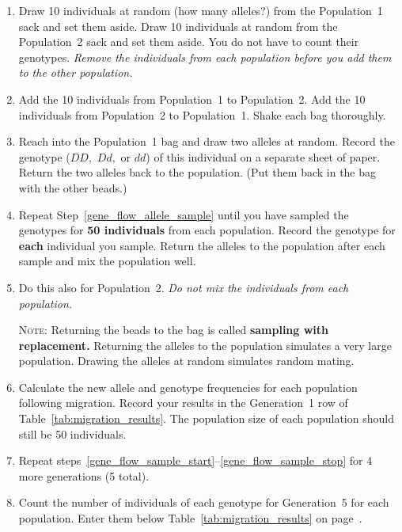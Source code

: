 \documentclass[12pt, hidelinks]{exam}
\newcommand{\allele}[1]{$#1$}
\begin{document}
\begin{questions}
\begin{enumerate}
	\item \label{gene_flow_sample_start}Draw 10 individuals at random (how many alleles?) from the Population~1 sack and set them aside. Draw 10 individuals at random from the Population~2 sack and set them aside. You do not have to count their genotypes. \emph{Remove the individuals from each population before you add them to the other population.}
	
	\item Add the 10 individuals from Population~1 to Population~2. Add the 10 individuals from Population~2 to Population~1. Shake each bag thoroughly.
	
	\item \label{gene_flow_allele_sample} Reach into the Population~1 bag and draw two alleles at random. Record the genotype (\allele{DD,} \allele{Dd,} or \allele{dd}) of this individual on a separate sheet of paper. Return the two alleles back to the population. (Put them back in the bag with the other beads.)
	
	\item Repeat Step~\ref{gene_flow_allele_sample} until you have sampled the genotypes for \textbf{50 individuals} from each population. Record the genotype for \textbf{each} individual you sample. Return the alleles to the population after each sample and mix the population well. 

	\item Do this also for Population~2.
	\emph{Do not mix the individuals from each population.}
	
	\textsc{Note:} Returning the beads to the bag is called \textbf{sampling with replacement.} Returning the alleles to the population simulates a very large population. Drawing the alleles at random simulates random mating.
	
	\item \label{gene_flow_sample_stop} Calculate the new allele and genotype frequencies for each population following migration. Record your results in the Generation~1 row of Table~\ref{tab:migration_results}. The population size of each population should still be 50 individuals.
	
	\item Repeat steps~\ref{gene_flow_sample_start}–\ref{gene_flow_sample_stop} for 4 more generations (5 total).%
	
	\item Count the number of individuals of each genotype for Generation~5 for each population. Enter them below Table~\ref{tab:migration_results} on page~\pageref{tab:migration_results}. 


\end{enumerate}
\end{questions}
\end{document}
